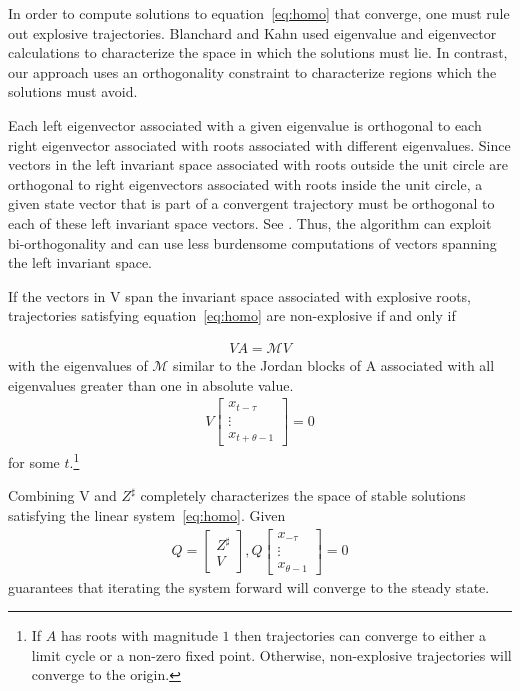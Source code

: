 \documentclass[12pt]{article}
\begin{document}
\label{sec:invariantSpace}
In order to compute solutions to equation~\ref{eq:homo} that converge, 
one must rule out explosive trajectories. Blanchard and Kahn\cite{blanchard80} 
used eigenvalue and eigenvector calculations to characterize the space in 
which the solutions must lie. In contrast, our approach uses
an orthogonality constraint to characterize regions which the solutions 
must avoid.



Each left  eigenvector associated with a given eigenvalue
is orthogonal to each right eigenvector associated 
with roots associated with  different eigenvalues.
Since vectors in the left invariant space
associated with roots outside the unit circle are orthogonal to right eigenvectors associated with roots 
inside the
unit circle, a given state vector that is part of a convergent trajectory
must be orthogonal to each of these left invariant space vectors. See \cite{anderson10}.
Thus, the algorithm can exploit bi-orthogonality and can use
less burdensome computations of vectors spanning the 
left invariant space.




If the vectors in V span the invariant space associated with explosive
roots,  trajectories satisfying equation~\ref{eq:homo} 
are non-explosive if and only if

\begin{gather}
 V A =   \mathcal{M}  V 
\end{gather}
with the eigenvalues of $ \mathcal{M}$ similar to the 
Jordan blocks of A associated with all eigenvalues
greater than one in absolute value.
\begin{gather}
V 
\begin{bmatrix}
  x_{t-\tau}\\
\vdots\\
  x_{t+\theta-1}
\end{bmatrix}=0
\end{gather}
for some $t$.\footnote{
If $A$ has roots with magnitude $1$ then trajectories can converge to 
either a limit cycle or a non-zero fixed point. Otherwise,
non-explosive trajectories will converge to the origin.}





Combining V and $Z^\sharp$  completely characterizes the space of 
stable solutions satisfying the linear system~\ref{eq:homo}.
Given
\begin{gather}
  Q= 
  \begin{bmatrix}
    Z^{\sharp}\\V
  \end{bmatrix},
Q
\begin{bmatrix}
  x_{-\tau} \\ \vdots \\ x_{\theta-1}
\end{bmatrix}=0 
\end{gather}
guarantees that iterating the system forward will converge to the steady state.
\end{document}
